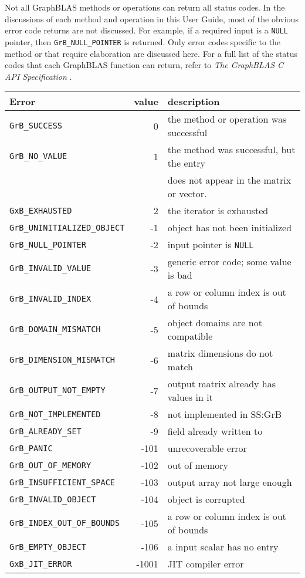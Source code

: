 \documentclass[12pt]{article}
\begin{document}
Not all GraphBLAS methods or operations can return all status codes.
In the discussions of each method and operation in this User Guide, most of the
obvious error code returns are not discussed.  For example, if a required input
is a \verb'NULL' pointer, then \verb'GrB_NULL_POINTER' is returned.  Only error
codes specific to the method or that require elaboration are discussed here.
For a full list of the status codes that each GraphBLAS function can return,
refer to {\em The GraphBLAS C API Specification} \cite{spec,spec2}.

\vspace{0.2in}
\noindent
{\small
\begin{tabular}{lrp{2.8in}}
\hline
Error                         & value & description \\
\hline
\verb'GrB_SUCCESS'              & 0   & the method or operation was successful \\
\verb'GrB_NO_VALUE'             & 1   & the method was successful, but the entry \\
                                &     & does not appear in the matrix or vector. \\
\verb'GxB_EXHAUSTED'            & 2   & the iterator is exhausted \\
\hline
\hline
\verb'GrB_UNINITIALIZED_OBJECT' & -1   & object has not been initialized \\
\verb'GrB_NULL_POINTER'         & -2   & input pointer is \verb'NULL' \\
\verb'GrB_INVALID_VALUE'        & -3   & generic error code; some value is bad \\
\verb'GrB_INVALID_INDEX'        & -4   & a row or column index is out of bounds \\
\verb'GrB_DOMAIN_MISMATCH'      & -5   & object domains are not compatible \\
\verb'GrB_DIMENSION_MISMATCH'   & -6   & matrix dimensions do not match \\
\verb'GrB_OUTPUT_NOT_EMPTY'     & -7   & output matrix already has values in it \\
\verb'GrB_NOT_IMPLEMENTED'      & -8   & not implemented in SS:GrB \\
\verb'GrB_ALREADY_SET'          & -9   & field already written to \\
\verb'GrB_PANIC'                & -101 & unrecoverable error \\
\verb'GrB_OUT_OF_MEMORY'        & -102 & out of memory \\
\verb'GrB_INSUFFICIENT_SPACE'   & -103 & output array not large enough \\
\verb'GrB_INVALID_OBJECT'       & -104 & object is corrupted \\
\verb'GrB_INDEX_OUT_OF_BOUNDS'  & -105 & a row or column index is out of bounds \\
\verb'GrB_EMPTY_OBJECT'         & -106 & a input scalar has no entry \\
\verb'GxB_JIT_ERROR'            &-1001 & JIT compiler error \\
\hline
\end{tabular}
\vspace{0.2in}
}
\end{document}
